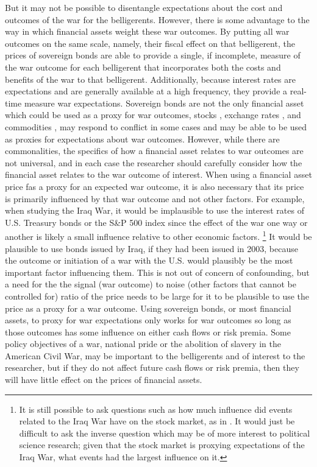 But it may not be possible to disentangle expectations about the cost and outcomes of the war for the belligerents.
However, there is some advantage to the way in which financial assets weight these war outcomes.
By putting all war outcomes on the same scale, namely, their fiscal effect on that belligerent, the prices of sovereign bonds are able to provide a single, if incomplete, measure of the war outcome for each belligerent that incorporates both the costs and benefits of the war to that belligerent.
Additionally, because interest rates are expectations and are generally available at a high frequency, they provide a real-time measure war expectations.
Sovereign bonds are not the only financial asset which could be used as a proxy for war outcomes, stocks \parencites{ChenSiems2004}{SchneiderTroeger2006}{WolfersZitzewitz2009}, exchange rates \parencites{Hall2004}, and commodities \parencites{WolfersZitzewitz2009}, may respond to conflict in some cases and may be able to be used as proxies for expectations about war outcomes.
However, while there are commonalities, the specifics of how a financial asset relates to war outcomes are not universal, and in each case the researcher should carefully consider how the financial asset relates to the war outcome of interest.
When using a financial asset price fas a proxy for an expected war outcome, it is also necessary that its price is primarily influenced by that war outcome and not other factors.
For example, when studying the Iraq War, it would be implausible to use the interest rates of U.S. Treasury bonds or the S\&P 500 index since the effect of the war one way or another is likely a small influence relative to other economic factors.%
\footnote{
  It is still possible to ask questions such as how much influence did events related to the Iraq War have on the stock market, as in \textcite{WolfersZitzewitz2009}.
  It would just be difficult to ask the inverse question which may be of more interest to political science research; given that the stock market is proxying expectations of the Iraq War, what events had the largest influence on it.
 }
It would be plausible to use bonds issued by Iraq, if they had been issued in 2003, because the outcome or initiation of a war with the U.S. would plausibly be the most important factor influencing them.
This is not out of concern of confounding, but a need for the the signal (war outcome) to noise (other factors that cannot be controlled for) ratio of the price needs to be large for it to be plausible to use the price as a proxy for a war outcome.
Using sovereign bonds, or most financial assets, to proxy for war expectations only works for war outcomes so long as those outcomes has some influence on either cash flows or risk premia.
Some policy objectives of a war, \eg{}national pride or the abolition of slavery in the American Civil War, may be important to the belligerents and of interest to the researcher, but if they do not affect future cash flows or risk premia, then they will have little effect on the prices of financial assets.

